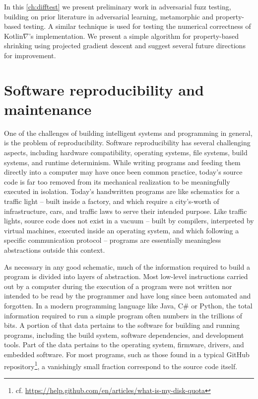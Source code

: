 \documentclass[12pt,initial,twoside,maitrise]{dms}
\numberwithin{equation}{section}
\numberwithin{table}{chapter}
\numberwithin{figure}{chapter}
\begin{document}
In this \autoref{ch:difftest} we present preliminary work in adversarial fuzz testing, building on prior literature in adversarial learning, metamorphic and property-based testing. A similar technique is used for testing the numerical correctness of Kotlin$\nabla$'s implementation. We present a simple algorithm for property-based shrinking using projected gradient descent and suggest several future directions for improvement.

\section{Software reproducibility and maintenance}

One of the challenges of building intelligent systems and programming in general, is the problem of reproducibility. Software reproducibility has several challenging aspects, including hardware compatibility, operating systems, file systems, build systems, and runtime determinism. While writing programs and feeding them directly into a computer may have once been common practice, today's source code is far too removed from its mechanical realization to be meaningfully executed in isolation. Today's handwritten programs are like schematics for a traffic light -- built inside a factory, and which require a city's-worth of infrastructure, cars, and traffic laws to serve their intended purpose. Like traffic lights, source code does not exist in a vacuum -- built by compilers, interpreted by virtual machines, executed inside an operating system, and which following a specific communication protocol -- programs are essentially meaningless abstractions outside this context.

As necessary in any good schematic, much of the information required to build a program is divided into layers of abstraction. Most low-level instructions carried out by a computer during the execution of a program were not written nor intended to be read by the programmer and have long since been automated and forgotten. In a modern programming language like Java, C\# or Python, the total information required to run a simple program often numbers in the trillions of bits. A portion of that data pertains to the software for building and running programs, including the build system, software dependencies, and development tools. Part of the data pertains to the operating system, firmware, drivers, and embedded software. For most programs, such as those found in a typical GitHub repository\footnote{cf. \url{https://help.github.com/en/articles/what-is-my-disk-quota}}, a vanishingly small fraction correspond to the source code itself.
\end{document}
